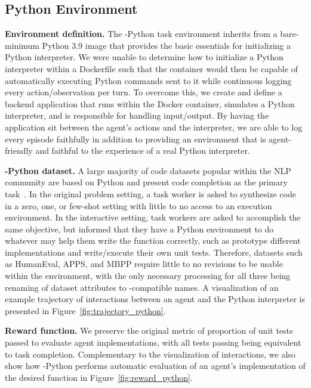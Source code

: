 \subsection{Python Environment}
\textbf{Environment definition.} The \benchmark{}-Python task environment inherits from a bare-minimum Python 3.9 image that provides the basic essentials for initializing a Python interpreter.
We were unable to determine how to initialize a Python interpreter within a Dockerfile such that the container would then be capable of automatically executing Python commands sent to it while continuous logging every action/observation per turn.
To overcome this, we create and define a backend application that runs within the Docker container, simulates a Python interpreter, and is responsible for handling input/output.
By having the application sit between the agent's actions and the interpreter, we are able to log every episode faithfully in addition to providing an environment that is agent-friendly and faithful to the experience of a real Python interpreter.

\textbf{\benchmark{}-Python dataset.} A large majority of code datasets popular within the NLP community are based on Python and present code completion as the primary task~\cite{chen2021evaluating,austin2021program,hendrycksapps2021}.
In the original problem setting, a task worker is asked to synthesize code in a zero, one, or few-shot setting with little to no access to an execution environment.
In the interactive setting, task workers are asked to accomplish the same objective, but informed that they have a Python environment to do whatever may help them write the function correctly, such as prototype different implementations and write/execute their own unit tests.
Therefore, datasets such as HumanEval, APPS, and MBPP require little to no revisions to be usable within the \benchmark{} environment, with the only necessary processing for all three being renaming of dataset attributes to \benchmark{}-compatible names.
A visualization of an example trajectory of interactions between an agent and the Python interpreter is presented in Figure~\ref{fig:trajectory_python}.

\textbf{Reward function.} We preserve the original metric of proportion of unit tests passed to evaluate agent implementations, with all tests passing being equivalent to task completion.
Complementary to the visualization of interactions, we also show how \benchmark{}-Python performs automatic evaluation of an agent's implementation of the desired function in Figure~\ref{fig:reward_python}.

